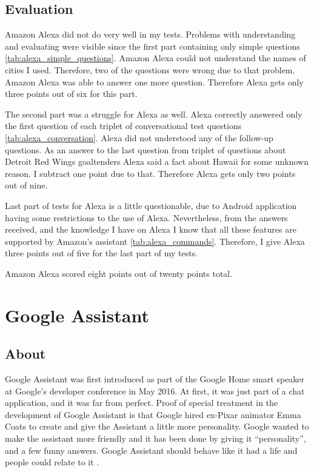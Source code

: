 \documentclass[
  digital, %
  oneside, %
  table,   %
  lof,     %
  lot,     %
]{fithesis3}
\begin{document}
\section{Evaluation}

Amazon Alexa did not do very well in my tests. Problems with understanding and evaluating were visible since the first part containing only simple questions \ref{tab:alexa_simple_questions}. Amazon Alexa could not understand the names of cities I used. Therefore, two of the questions were wrong due to that problem. Amazon Alexa was able to answer one more question. Therefore Alexa gets only three points out of six for this part.

The second part was a struggle for Alexa as well. Alexa correctly answered only the first question of each triplet of conversational test questions \ref{tab:alexa_conversation}. Alexa did not understood any of the follow-up questions. As an answer to the last question from triplet of questions about Detroit Red Wings goaltenders Alexa said a fact about Hawaii for some unknown reason. I subtract one point due to that. Therefore Alexa gets only two points out of nine.

Last part of tests for Alexa is a little questionable, due to Android application having some restrictions to the use of Alexa. Nevertheless, from the answers received, and the knowledge I have on Alexa I know that all these features are supported by Amazon's assistant \ref{tab:alexa_commands}. Therefore, I give Alexa three points out of five for the last part of my tests.

Amazon Alexa scored eight points out of twenty points total.

\chapter{Google Assistant}\label{ch:google}
\section{About}

Google Assistant was first introduced as part of the Google Home smart speaker at Google's developer conference in May 2016. At first, it was just part of a chat application, and it was far from perfect. Proof of special treatment in the development of Google Assistant is that Google hired ex-Pixar animator Emma Coats to create and give the Assistant a little more personality. Google wanted to make the assistant more friendly and it has been done by giving it ``personality'', and a few funny answers. Google Assistant should behave like it had a life and people could relate to it \parencite{google_childhood}.
\end{document}
